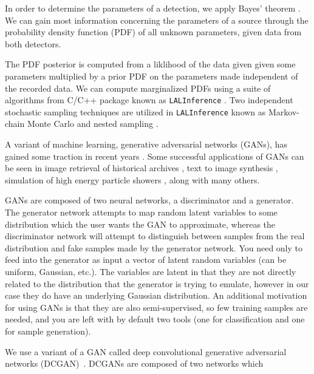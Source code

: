 \documentclass[%
showpacs,
 amsmath,amssymb,
 aps,
 twocolumn,
 prl,
 reprint,
floatfix,
]{revtex4-1}
\begin{document}
%
%
In order to determine the parameters of a detection, we apply Bayes' theorem
\cite{Bayes and R. Price, Phil. Trans. R. Soc. London 53, 370 (1763). E. T.
Jaynes, Probability Theory: The Logic of Science, edited by G. L. Bretthorst
(Cambridge University Press, Cambridge, England, 2003).}. We can gain most
information concerning the parameters of a source through the probability
density function (PDF) of all unknown parameters, given data from both
detectors. 

The PDF posterior is computed from a liklihood of the data given given some
parameters multiplied by a prior PDF on  the parameters made independent of the
recorded data. We can compute marginalized PDFs using a suite of algorithms
from C/C++ package known as \texttt{LALInference} \cite{LALSuite}. Two
independent stochastic sampling techniques are utilized in
\texttt{LALInference} known as Markov-chain Monte Carlo \cite{MCMC paper} and
nested sampling \cite{nested sampling}. 

   

%
%
A variant of machine learning, generative adversarial networks (GANs), has
gained some traction in recent years \cite{arxiv:1406.2661}. Some successful
applications of GANs can be seen in image retrieval of historical archives
\cite{arxiv:1607.02748}, text to image synthesis \cite{arxiv:1605.05396},
simulation of high energy particle showers \cite{arxiv:1712.10321}, along with
many others. 

GANs are composed of two neural networks, a discriminator and a generator. The
generator network attempts to map random latent variables to some distribution
which the user wants the GAN to approximate, whereas the discriminator network
will attempt to distinguish between samples from the real distribution and fake
samples made by the generator network. You need only to feed into the generator
as input a vector of latent random variables (can be uniform, Gaussian, etc.).
The variables are latent in that they are not directly related to the
distribution that the generator is trying to emulate, however in our case they
do have an underlying Gaussian distribution. An additional motivation for using
GANs is that they are also semi-supervised, so few training samples are needed,
and you are left with by default two tools (one for classification and one for
sample generation).  

We use a variant of a GAN called deep convolutional generative adversarial
networks (DCGAN)~\cite{1511.06434}. DCGANs are composed of two networks which
\end{document}
